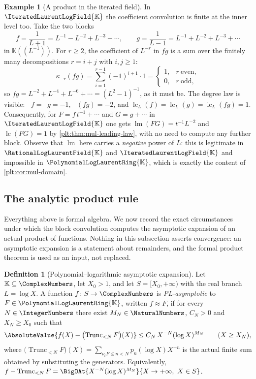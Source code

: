 \documentclass[11pt,oneside]{article}
\theoremstyle{plain}
\theoremstyle{definition}
\newtheorem{definition}[theorem]{Definition}
\newtheorem{example}[theorem]{Example}
\theoremstyle{remark}
\newcommand{\K}{\mathbb{K}}
\newcommand{\PLlau}{\PolynomialLogLaurentRing{\K}}       %
\newcommand{\PLrat}{\RationalLogLaurentField{\K}}        %
\newcommand{\PLit}{\IteratedLaurentLogField{\K}}         %
\newcommand{\ordt}{\nu_{t}}                              %
\DeclareMathOperator{\lm}{lm}
\DeclareMathOperator{\lc}{lc}
\DeclareMathOperator{\degL}{deg_{L}}
\newcommand{\Trunc}[2]{\operatorname{Trunc}_{<#2}#1}     %
\begin{document}
\begin{example}[A product in the iterated field]
\label{plt:ex:mul-worked-iterated}
In $\PLit$ the coefficient convolution is finite at the inner level too.
Take the two blocks
\[
 f=\frac1{L+1}=L^{-1}-L^{-2}+L^{-3}-\cdots,
 \qquad
 g=\frac1{L-1}=L^{-1}+L^{-2}+L^{-3}+\cdots
\]
in $\K((L^{-1}))$.  For $r\ge2$, the coefficient of $L^{-r}$ in $fg$ is a sum
over the finitely many decompositions $r=i+j$ with $i,j\ge1$:
\[
 \kappa_{-r}(fg)=\sum_{i=1}^{r-1}(-1)^{i+1}\cdot1
 =\begin{cases}1,&r\ \text{even},\\0,&r\ \text{odd},\end{cases}
\]
so $fg=L^{-2}+L^{-4}+L^{-6}+\cdots=(L^2-1)^{-1}$, as it must be.  The
degree law is visible: $\degL f=\degL g=-1$, $\degL(fg)=-2$, and
$\lc_L(f)=\lc_L(g)=\lc_L(fg)=1$.  Consequently, for
$F=f\,t^{-1}+\cdots$ and $G=g+\cdots$ in $\PLit$ one gets
$\lm(FG)=t^{-1}L^{-2}$ and $\lc(FG)=1$ by
\cref{plt:thm:mul-leading-law}, with no need to compute any further block.
Observe that $\lm$ here carries a \emph{negative} power of $L$: this is
legitimate in $\PLrat$ and $\PLit$ and impossible in $\PLlau$, which is
exactly the content of \cref{plt:cor:mul-domain}.
\end{example}

\subsection{The analytic product rule}
\label{plt:sec:mul-analytic}

Everything above is formal algebra.  We now record the exact circumstances
under which the block convolution computes the asymptotic expansion of an
actual product of functions.  Nothing in this subsection asserts
convergence: an asymptotic expansion is a statement about remainders, and the
formal product theorem is used as an input, not replaced.

\begin{definition}[Polynomial--logarithmic asymptotic expansion]
\label{plt:def:mul-asymptotic}
Let $\K\subseteq\ComplexNumbers$, let $X_0>1$, and let $S=[X_0,+\infty)$ with
the real branch $L=\log X$.  A function $f\colon S\to\ComplexNumbers$ is
\emph{PL-asymptotic} to $F\in\PLlau$, written $f\approx F$, if for every
$N\in\IntegerNumbers$ there exist $M_N\in\NaturalNumbers$, $C_N>0$ and
$X_N\ge X_0$ such that
\begin{equation}\label{plt:eq:mul-asymptotic}
 \AbsoluteValue{f(X)-\bigl(\Trunc{F}{N}\bigr)(X)}
 \le C_N\,X^{-N}(\log X)^{M_N}
 \qquad(X\ge X_N),
\end{equation}
where $\bigl(\Trunc{F}{N}\bigr)(X)=\sum_{\ordt F\le n<N}p_n(\log X)X^{-n}$ is
the actual finite sum obtained by substituting the generators.  Equivalently,
$f-\Trunc{F}{N}=\BigOAt{X^{-N}(\log X)^{M_N}}{X\to+\infty,\ X\in S}$.
\end{definition}
\end{document}

